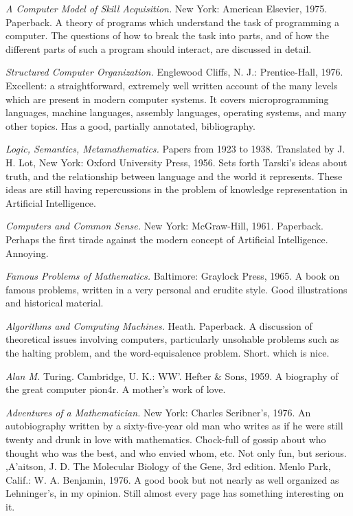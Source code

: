  {\sl A Computer Model of Skill Acquisition.} New York: American Elsevier, 1975. Paperback. A theory of programs which understand the task of programming a computer. The questions of how to break the task into parts, and of how the different parts of such a program should interact, are discussed in detail.

 {\sl Structured Computer Organization.} \llap{**\enspace}Englewood Cliffs, N. J.: Prentice-Hall, 1976. Excellent: a straightforward, extremely well written account of the many levels which are present in modern computer systems. It covers microprogramming languages, machine languages, assembly languages, operating systems, and many other topics. Has a good, partially annotated, bibliography.

 {\sl Logic, Semantics, Metamathematics.} Papers from 1923 to 1938. Translated by J. H. Lot, New York: Oxford University Press, 1956. Sets forth Tarski's ideas about truth, and the relationship between language and the world it represents. These ideas are still having repercussions in the problem of knowledge representation in Artificial Intelligence.

 {\sl Computers and Common Sense.} New York: McGraw-Hill, 1961. Paperback. Perhaps the first tirade against the modern concept of Artificial Intelligence. Annoying.

 {\sl Famous Problems of Mathematics.} Baltimore: Graylock Press, 1965. A book on famous problems, written in a very personal and erudite style. Good illustrations and historical material.

 {\sl Algorithms and Computing Machines.} Heath. Paperback. A discussion of theoretical issues involving computers, particularly unsohable problems such as the halting problem, and the word-equisalence problem. Short. which is nice.

 {\sl Alan M.} Turing. Cambridge, U. K.: WW'. Hefter \& Sons, 1959. A biography of the great computer pion4r. A mother's work of love.

 {\sl Adventures of a Mathematician.} \llap{*\enspace}New York: Charles Scribner's, 1976. An autobiography written by a sixty-five-year old man who writes as if he were still twenty and drunk in love with mathematics. Chock-full of gossip about who thought who was the best, and who envied whom, etc. Not only fun, but serious. ,A'aitson, J. D. The Molecular Biology of the Gene, 3rd edition. Menlo Park, Calif.: W. A. Benjamin, 1976. A good book but not nearly as well organized as Lehninger's, in my opinion. Still almost every page has something interesting on it.

